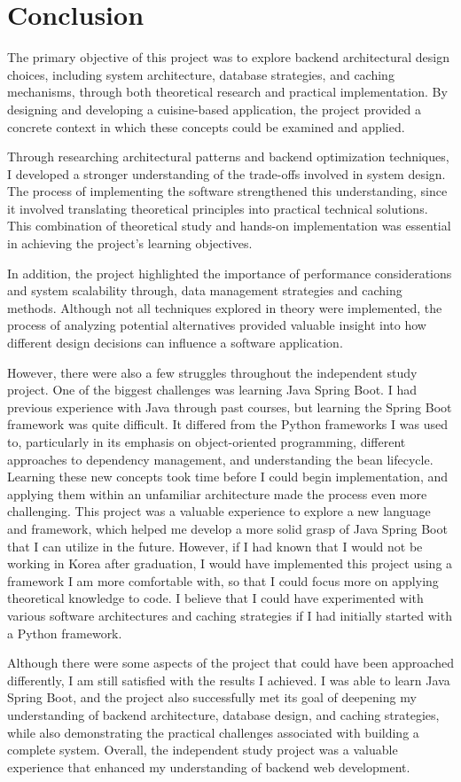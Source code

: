 \section{Conclusion}

The primary objective of this project was to explore backend architectural design choices, 
including system architecture, database strategies, and caching mechanisms, 
through both theoretical research and practical implementation. 
By designing and developing a cuisine-based application, 
the project provided a concrete context in which these concepts could be examined and applied.

Through researching architectural patterns and backend optimization techniques, 
I developed a stronger understanding of the trade-offs involved in system design. 
The process of implementing the software strengthened this understanding, 
since it involved translating theoretical principles into practical technical solutions.
This combination of theoretical study and hands-on implementation 
was essential in achieving the project's learning objectives.

In addition, the project highlighted the importance of performance considerations and system scalability through, 
data management strategies and caching methods.
Although not all techniques explored in theory were implemented, 
the process of analyzing potential alternatives provided valuable insight 
into how different design decisions can influence a software application.

However, there were also a few struggles throughout the independent study project. One of the biggest challenges was learning Java Spring Boot.
I had previous experience with Java through past courses, but learning the Spring Boot framework was quite difficult.
It differed from the Python frameworks I was used to, particularly in its emphasis on object-oriented programming,
different approaches to dependency management, and understanding the bean lifecycle.
Learning these new concepts took time before I could begin implementation, and applying them within an unfamiliar architecture made the process even more challenging.
This project was a valuable experience to explore a new language and framework, which helped me develop a more solid grasp of Java Spring Boot that I can utilize in the future.
However, if I had known that I would not be working in Korea after graduation, I would have implemented this project using a framework I am more comfortable with,
so that I could focus more on applying theoretical knowledge to code. I believe that I could have experimented with various software architectures
and caching strategies if I had initially started with a Python framework.

Although there were some aspects of the project that could have been approached differently, I am still satisfied with the results I achieved.
I was able to learn Java Spring Boot, and the project also successfully met its goal of deepening my understanding 
of backend architecture, database design, and caching strategies, 
while also demonstrating the practical challenges associated with building a complete system.
Overall, the independent study project was a valuable experience that enhanced my understanding of backend web development.
